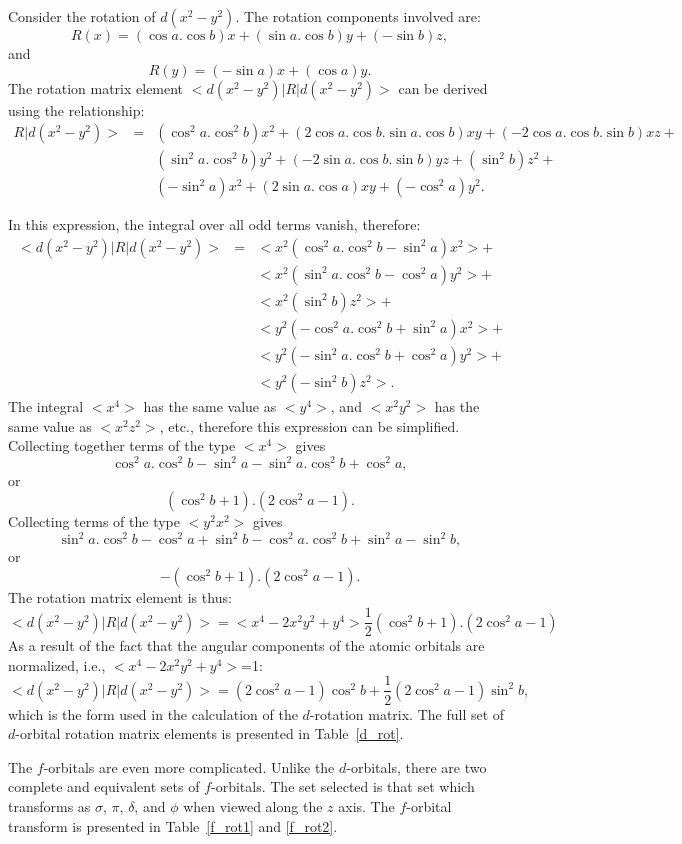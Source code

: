 Consider the rotation of $d(x^2-y^2)$. The rotation components involved are:
$$
R(x) = (\cos a.\cos b)x +(\sin a.\cos b)y +(-\sin b)z,
$$
and
$$
R(y) = (-\sin a)x +(\cos a)y.
$$
The rotation matrix element $<d(x^2-y^2)|R|d(x^2-y^2)>$ can be derived
using the relationship:
\begin{eqnarray}
R|d(x^2-y^2)> &=& (\cos^2 a.\cos^2 b)x^2+(2\cos a.\cos b.\sin a.\cos b)xy+
                (-2\cos a.\cos b.\sin b)xz+\nonumber \\
              & & (\sin^2a.\cos^2b)y^2+(-2\sin a.\cos b.\sin b)yz+
(\sin^2b)z^2+\nonumber \\
              & &(-\sin^2a)x^2+(2\sin a.\cos a)xy+(-\cos^2a)y^2.\nonumber
\end{eqnarray}

In this expression, the integral over all odd terms vanish, therefore:
\begin{eqnarray}
<d(x^2-y^2)|R|d(x^2-y^2)>&=&
<x^2(\cos^2 a.\cos^2 b-\sin^2a)x^2>+\nonumber \\
& &<x^2(\sin^2a.\cos^2b-\cos^2a)y^2>+\nonumber \\
& &<x^2(\sin^2b)z^2>+\nonumber \\
& &<y^2(-\cos^2 a.\cos^2 b+\sin^2a)x^2>+\nonumber \\
& &<y^2(-\sin^2a.\cos^2b+\cos^2a)y^2>+ \nonumber \\
& &<y^2(-\sin^2b)z^2>.\nonumber
\end{eqnarray}
The integral $<\!x^4\!>$ has the same value as $<\!y^4\!>$, and
$<\!x^2y^2\!>$ has the same
value as $<\!x^2z^2\!>$, etc., therefore this expression can be simplified.
Collecting together terms of the type $<\!x^4\!>$ gives
$$
\cos^2 a.\cos^2 b-\sin^2a -\sin^2a.\cos^2b+\cos^2a,
$$
or
$$
(\cos^2b+1).(2\cos^2a-1).
$$
Collecting terms of the type $<\!y^2x^2\!>$ gives
$$
\sin^2a.\cos^2b-\cos^2a+\sin^2b-\cos^2 a.\cos^2 b+\sin^2a-\sin^2b,
$$
or
$$
-(\cos^2b+1).(2\cos^2a-1).
$$
The rotation matrix element is thus:
$$
<d(x^2-y^2)|R|d(x^2-y^2)>=<\!x^4-2x^2y^2+y^4\!>\frac{1}{2}(\cos^2b+1).(2\cos^2a-1)
$$
As a result of the fact that the angular components of the atomic orbitals
are normalized, i.e., $<\!x^4-2x^2y^2+y^4\!>$=1:
$$
<d(x^2-y^2)|R|d(x^2-y^2)>=(2\cos^2a-1)\cos^2b+\frac{1}{2}(2\cos^2a-1)\sin^2b,
$$
which is the form used in the calculation of the $d$-rotation matrix.
The full set of $d$-orbital rotation matrix elements is presented in
Table~\ref{d_rot}.


The $f$-orbitals are even more complicated.  Unlike the $d$-orbitals, there are
two complete and equivalent sets of $f$-orbitals.  The set selected is that set
which transforms as $\sigma$, $\pi$, $\delta$, and $\phi$ when viewed along the
$z$ axis.  The $f$-orbital transform is presented in Table~\ref{f_rot1} and
\ref{f_rot2}.

